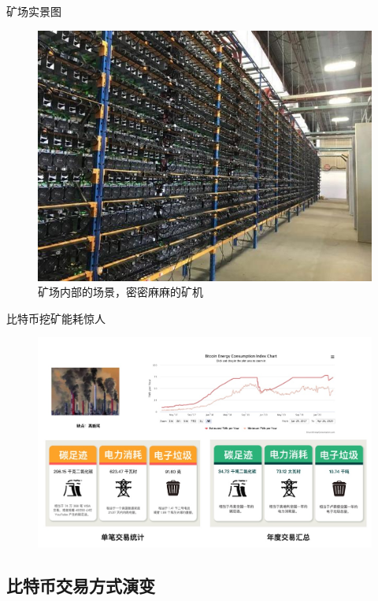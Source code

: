 \documentclass[11pt]{beamer}
\begin{document}
\begin{frame}{矿场实景图}
	\begin{figure}
		\centering
		\includegraphics[width=0.7\linewidth]{figures/miningFactory}
		\caption{矿场内部的场景，密密麻麻的矿机}
		\label{fig:miningfactory}
	\end{figure}
\end{frame}

\begin{frame}{比特币挖矿能耗惊人}
	\begin{figure}
		\centering
		\includegraphics[width=0.88\linewidth]{figures/powerWastedOfBTCjpg}
		\label{fig:powerwastedofbtcjpg}
	\end{figure}

\end{frame}
\subsection{比特币交易方式演变}
\end{document}

